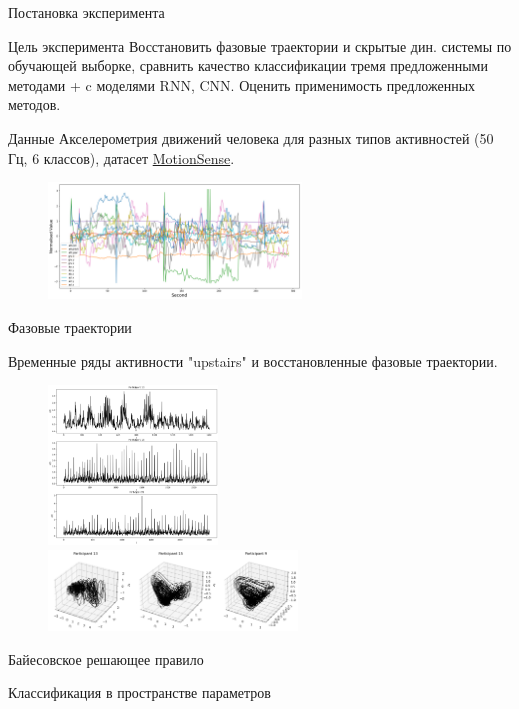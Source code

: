 \documentclass[10pt]{beamer}
\theoremstyle{definition}
\begin{document}
	\begin{frame}{Постановка эксперимента}
		
		\begin{block}{Цель эксперимента}
			Восстановить фазовые траектории и скрытые дин. системы по обучающей выборке, сравнить качество классификации тремя предложенными методами + c моделями RNN, CNN. Оценить применимость предложенных методов.
		\end{block}
		
		\begin{exampleblock}{Данные}
			Акселерометрия движений человека для разных типов активностей (50 Гц, 6 классов), датасет \href{https://github.com/mmalekzadeh/motion-sense}{MotionSense}.
		\end{exampleblock}
		
		\begin{figure}[h]
			\centering
			\includegraphics[width=0.6\textwidth]{img/motionsense}
		\end{figure}
		
	\end{frame}	
	
	\begin{frame}{Фазовые траектории}
		
		Временные ряды активности "upstairs" и восстановленные фазовые траектории.
		
		\begin{figure}
			\centering
			\includegraphics[width=0.4\textwidth]{img/series_ups.png}
			\includegraphics[width=0.59\textwidth]{img/phase_ups.png}
		\end{figure}
		
	\end{frame}	
	
	\begin{frame}{Байесовское решающее правило}
		
		
		
	\end{frame}	
	
	\begin{frame}{Классификация в пространстве параметров}
		
		
	\end{frame}	
	
\end{document}
